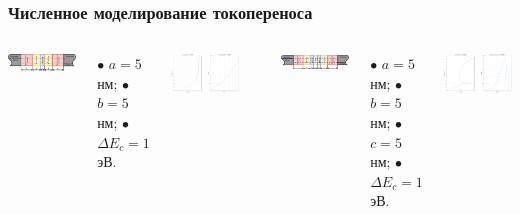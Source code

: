 \documentclass[10pt,pdf,hyperref={unicode},aspectratio={169}]{beamer}
\begin{document}
\begin{frame}
	\frametitle{Численное моделирование токопереноса}
	\begin{columns}
	   	\includegraphics[width=\linewidth]{assets/BHS}

		{\scriptsize $\bullet$ $a = 5$ нм; $\bullet$ $b = 5$ нм; $\bullet$ $\Delta E_{c} = 1$эВ.}

	   	\includegraphics[width=\linewidth]{assets/JBHS}
		\rule[1mm]{0.2ex}{70mm}
	   	\includegraphics[width=1.05\linewidth]{assets/RTHS}

		{\scriptsize $\bullet$ $a = 5$ нм; $\bullet$ $b = 5$ нм; $\bullet$ $c = 5$ нм; $\bullet$ $\Delta E_{c} = 1$эВ.}

	   	\includegraphics[width=1.05\linewidth]{assets/JRTHS}
	\end{columns}
\end{frame}
\end{document}
